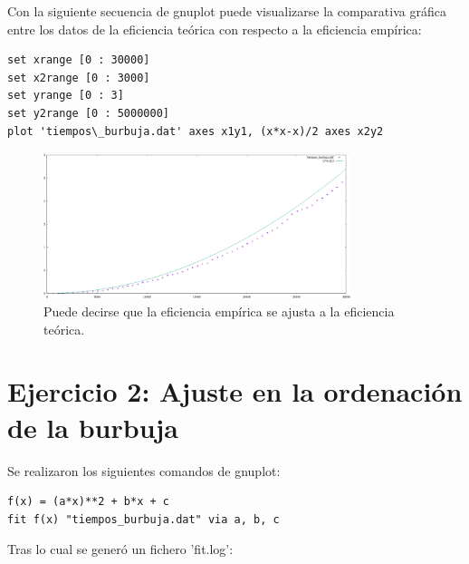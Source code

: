 \documentclass[paper=a4, fontsize=10pt]{scrartcl} %
\begin{document}
Con la siguiente secuencia de gnuplot puede visualizarse la comparativa gráfica entre los datos de la eficiencia teórica con respecto a la eficiencia empírica:

\begin{lstlisting}
set xrange [0 : 30000]
set x2range [0 : 3000]
set yrange [0 : 3]
set y2range [0 : 5000000]
plot 'tiempos\_burbuja.dat' axes x1y1, (x*x-x)/2 axes x2y2
\end{lstlisting}
\begin{figure}[H] %
	\centering
	\label{lsblk}
	\includegraphics[width=0.8\textwidth]{../imgs/c2.PNG}
	\caption{Puede decirse que la eficiencia empírica se ajusta a la eficiencia teórica.} 
\end{figure}

\section{ Ejercicio 2: Ajuste en la ordenación de la burbuja}

Se realizaron los siguientes comandos de gnuplot:

\begin{lstlisting}
f(x) = (a*x)**2 + b*x + c
fit f(x) "tiempos_burbuja.dat" via a, b, c
\end{lstlisting}

Tras lo cual se generó un fichero 'fit.log':
\end{document}
